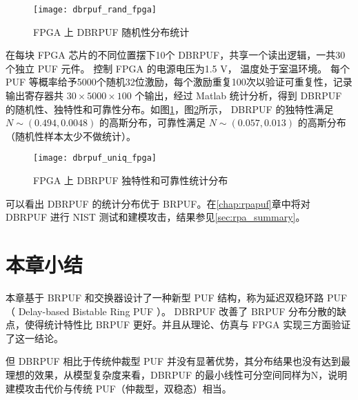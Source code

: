\begin{figure}[htb]
\centering
\texttt{[image: dbrpuf\_rand\_fpga]}
\caption{FPGA 上 DBRPUF 随机性分布统计}
\label{fig:dbr_rand}
\end{figure}

在每块 FPGA 芯片的不同位置摆下10个 DBRPUF，共享一个读出逻辑，一共30个独立 PUF 元件。
控制 FPGA 的电源电压为1.5 V，
温度处于室温环境。
每个 PUF 等概率给予5000个随机32位激励，每个激励重复100次以验证可重复性，记录输出寄存器共 $ 30\times 5000\times 100 $ 个输出，经过 Matlab 统计分析，得到 DBRPUF 的随机性、独特性和可靠性分布。如图\ref{fig:dbr_rand}，图\ref{fig:dbrpuf_dist_fpga}所示， DBRPUF 的独特性满足 $ N\sim(0.494,0.0048) $ 的高斯分布，可靠性满足 $ N\sim(0.057,0.013) $ 的高斯分布（随机性样本太少不做统计）。

\begin{figure}[htb!]
\centering
\texttt{[image: dbrpuf\_uniq\_fpga]}
\caption{FPGA 上 DBRPUF 独特性和可靠性统计分布}
\label{fig:dbrpuf_dist_fpga}
\end{figure}

可以看出 DBRPUF 的统计分布优于 BRPUF。在\ref{chap:rpapuf}章中将对 DBRPUF 进行 NIST 测试和建模攻击，结果参见\ref{sec:rpa_summary}。

\section{本章小结}
本章基于 BRPUF 和交换器设计了一种新型 PUF 结构，称为延迟双稳环路 PUF （ Delay-based Bistable Ring PUF ）。
DBRPUF 改善了 BRPUF 分布分散的缺点，使得统计特性比 BRPUF 更好。并且从理论、仿真与 FPGA 实现三方面验证了这一结论。

但 DBRPUF 相比于传统仲裁型 PUF 并没有显著优势，其分布结果也没有达到最理想的效果，从模型复杂度来看，DBRPUF 的最小线性可分空间同样为N，说明建模攻击代价与传统 PUF（仲裁型，双稳态）相当。
